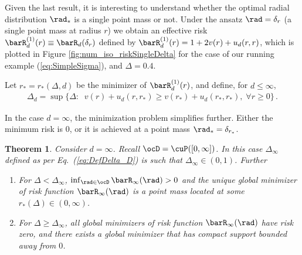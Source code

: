\documentclass[11pt]{article}
\newtheorem{theorem}{Theorem}
\newtheorem{remark}{Remark}[section]
\begin{document}
Given the last result, it is interesting to understand whether the optimal radial distribution $\rad_*$
is a single point mass or not. Under the ansatz $\rad = \delta_r$ (a single point mass at radius $r$)
we obtain an effective risk $\barR_d^{(1)}(r) \equiv \barR_d(\delta_r)$ defined by
$\barR_d^{(1)}(r)  = 1+2 v(r)+u_d(r,r)$, which is plotted in Figure
\ref{fig:num_iso_riskSingleDelta} for the case of our running example
(\ref{eq:SimpleSigma}), and $\Delta=0.4$.

%



Let $r_*=r_*(\Delta,d)$ be the minimizer of $\barR_d^{(1)}(r)$, and define, for $d\le \infty$,
%
\begin{align}
\Delta_d = \sup\big\{\Delta: \;\; v(r)+u_d(r,r_*)\ge v(r_*)+u_d(r_*,r_*),\; \forall r\ge 0 \big\}\, . \label{eq:DefDelta_D}
\end{align}
%

In the case $d=\infty$, the minimization problem simplifies further. Either the minimum risk is $0$, 
or it is achieved at a point mass $\rad_*=\delta_{r_*}$.
%
\begin{theorem}\label{thm:global_minimizer_infinite_d_isotropic}
Consider $d=\infty$. Recall $\ocD = \cuP([0, \infty])$. In this case $\Delta_{\infty}$ defined as per Eq.~(\ref{eq:DefDelta_D}) is such that $\Delta_{\infty}\in (0,1)$.
Further
%
\begin{enumerate}
\item For $\Delta < \Delta_\infty$, $\inf_{\rad\in\ocD}\barR_\infty(\rad)>0$ and  the unique global minimizer of risk function $\barR_\infty(\rad)$ is a point mass located at some $r_*(\Delta)\in(0,\infty)$. 
\item For  $\Delta \ge \Delta_\infty$, all global minimizers of risk function $\barR_\infty(\rad)$ have risk zero, and there exists a global minimizer that has compact support
bounded away from $0$. 
\end{enumerate}
%
\end{theorem}
\end{document}
